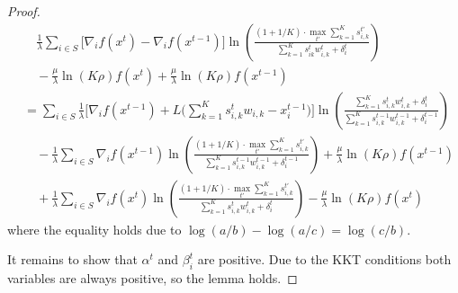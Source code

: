 \begin{proof}
\begin{align*}
            & \quad  \frac{1}{\lambda} \sum_{i \in S} \biggl[ \nabla_{i} f(x^{t}) - \nabla_{i} f(x^{t-1}) \biggr] \ln \left( \frac{(1 + 1/K) \cdot \max_{t'} \sum_{k=1}^{K} s_{i,k}^{t'}}{\sum_{k=1}^{K}  s_{ik}^{t}w_{i,k}^{t}  + \delta_{i}^{t}} \right)  \\
            & \quad - \frac{\mu}{\lambda} \ln(K\rho) f(x^{t}) + \frac{\mu}{\lambda} \ln(K\rho) f(x^{t-1}) \\
    & = \sum_{i \in S} \frac{1}{\lambda} \biggl[  \nabla_{i} f(x^{t-1}) + L\biggl( \sum_{k=1}^{K} s_{i,k}^{t} w_{i,k}  - x_{i}^{t-1} \biggr) \biggr] \ln \left( \frac{\sum_{k=1}^{K} s_{i,k}^{t} w_{i,k}^{t} + \delta_{i}^{t}}{\sum_{k=1}^{K}  s_{i,k}^{t-1}w_{i,k}^{t-1}  + \delta_{i}^{t-1}} \right) \\
            & \quad - \frac{1}{\lambda} \sum_{i \in S} \nabla_{i} f(x^{t-1}) \ln \left( \frac{(1 + 1/K) \cdot \max_{t'} \sum_{k=1}^{K} s_{i,k}^{t'}}{\sum_{k=1}^{K}  s_{i,k}^{t-1}w_{i,k}^{t-1}  + \delta_{i}^{t-1}} \right) + \frac{\mu}{\lambda} \ln(K\rho)  f(x^{t-1}) \\
            & \quad + \frac{1}{\lambda} \sum_{i \in S} \nabla_{i} f(x^{t}) \ln \left( \frac{(1 + 1/K) \cdot \max_{t'} \sum_{k=1}^{K} s_{i,k}^{t'}}{\sum_{k=1}^{K}  s_{i,k}^{t}w_{i,k}^{t}  + \delta_{i}^{t}} \right) - \frac{\mu}{\lambda} \ln(K\rho)  f(x^{t})
\end{align*}
where the equality holds due to $\log(a/b) - \log(a/c) = \log(c/b)$.

It remains to show that $\alpha^t$ and $\beta_i^t$ are positive. Due to the KKT conditions both variables are always positive, so the lemma holds.
\end{proof}

\clearpage

